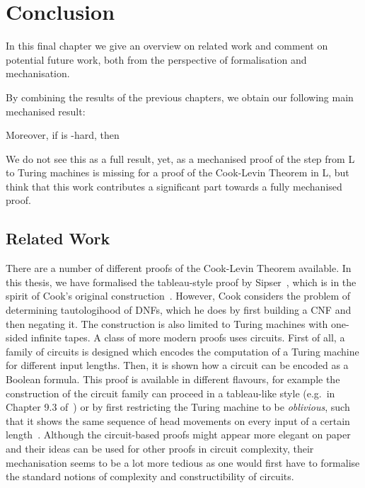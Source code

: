 \chapter{Conclusion}\label{chap:conclusion}
In this final chapter we give an overview on related work and comment on potential future work, both from the perspective of formalisation and mechanisation.

By combining the results of the previous chapters, we obtain our following main mechanised result:
\begin{theorem}
   Moreover, if \gennp{} is \NP{}-hard, then 
\end{theorem}
We do not see this as a full result, yet, as a mechanised proof of the step from L to Turing machines is missing for a proof of the Cook-Levin Theorem in L, but think that this work contributes a significant part towards a fully mechanised proof.

\section{Related Work}
There are a number of different proofs of the Cook-Levin Theorem available. In this thesis, we have formalised the tableau-style proof by Sipser~\cite[Chapter~7.4]{Sipser:TheoryofComputation}, which is in the spirit of Cook's original construction~\cite{cook_theorem}. However, Cook considers the problem of determining tautologihood of DNFs, which he does by first building a CNF and then negating it. The construction is also limited to Turing machines with one-sided infinite tapes.
A class of more modern proofs uses circuits. First of all, a family of circuits is designed which encodes the computation of a Turing machine for different input lengths. Then, it is shown how a circuit can be encoded as a Boolean formula. This proof is available in different flavours, for example the construction of the circuit family can proceed in a tableau-like style (e.g.\ in Chapter 9.3 of~\cite{Sipser:TheoryofComputation}) or by first restricting the Turing machine to be \textit{oblivious}, such that it shows the same sequence of head movements on every input of a certain length~\cite[p.~199ff]{Bläser:TISkript}.
Although the circuit-based proofs might appear more elegant on paper and their ideas can be used for other proofs in circuit complexity, their mechanisation seems to be a lot more tedious as one would first have to formalise the standard notions of complexity and constructibility of circuits.

